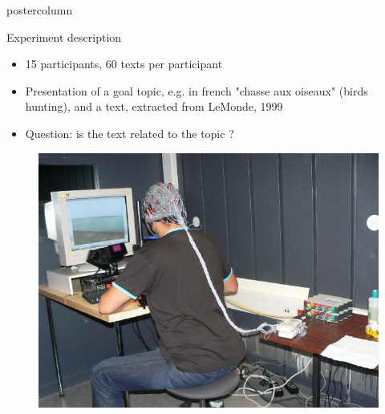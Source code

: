 \documentclass[final,hyperref={pdfpagelabels=false}]{beamer}
\newlength{\columnheight}
\begin{document}
\begin{frame}
  \begin{columns}
    \begin{column}{.50\textwidth}
      \begin{beamercolorbox}[center,wd=\textwidth]{postercolumn}
        \begin{minipage}[T]{.98\textwidth}  %
          \parbox[t][\columnheight]{\textwidth}{ %
            \begin{block}{Experiment description}
                \begin{itemize}
                    \item[\bullet] 15 participants, 60 texts per participant
                    \item[\bullet] Presentation of a goal topic, e.g. in french "chasse aux oiseaux" (birds hunting), and a text, extracted from LeMonde, 1999
                    \item[\bullet] Question: is the text related to the topic ?
                \end{itemize}
                \begin{minipage}{0.47\textwidth}
                    \begin{figure}[h]
                        \centering
                        \includegraphics[width=15cm]{efrp.jpg}

\end{figure}
\end{minipage}
\end{block}}
\end{minipage}
\end{beamercolorbox}
\end{column}
\end{columns}
\end{frame}
\end{document}
